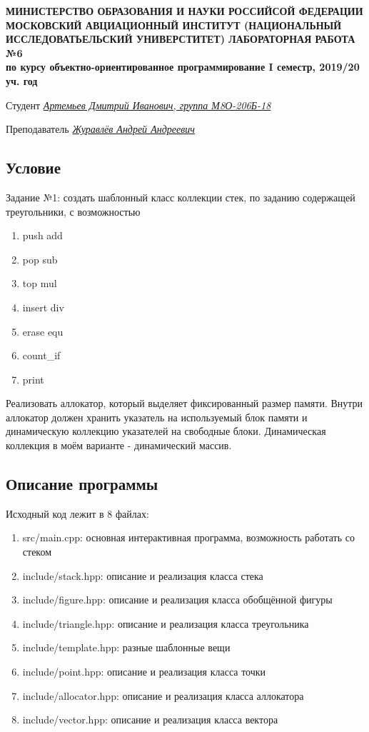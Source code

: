 \documentclass[12pt]{article}
\begin{document}
\begin{titlepage}
\begin{center}
\textbf{МИНИСТЕРСТВО ОБРАЗОВАНИЯ И НАУКИ РОССИЙСОЙ ФЕДЕРАЦИИ
\medskip
МОСКОВСКИЙ АВЦИАЦИОННЫЙ ИНСТИТУТ
(НАЦИОНАЛЬНЫЙ ИССЛЕДОВАТЬЕЛЬСКИЙ УНИВЕРСТИТЕТ)
\vfill\vfill
{\Huge ЛАБОРАТОРНАЯ РАБОТА №6} \\
по курсу объектно-ориентированное программирование
I семестр, 2019/20 уч. год}
\end{center}
\vfill

Студент \uline{\it {Артемьев Дмитрий Иванович, группа М8О-206Б-18}\hfill}

Преподаватель \uline{\it {Журавлёв Андрей Андреевич}\hfill}

\vfill
\end{titlepage}

\subsection*{Условие}

Задание №1: создать шаблонный класс коллекции стек, по заданию содержащей треугольники, с возможностью
\begin{enumerate}
\item push add
\item pop sub
\item top mul
\item insert div
\item erase equ
\item count\_if
\item print
\end{enumerate}

Реализовать аллокатор, который выделяет фиксированный размер памяти. Внутри аллокатор должен хранить указатель на используемый блок памяти и динамическую коллекцию указателей на свободные блоки. Динамическая коллекция в моём варианте - динамический массив. 

\subsection*{Описание программы}

Исходный код лежит в 8 файлах:
\begin{enumerate}
\item src/main.cpp: основная интерактивная программа, возможность работать со стеком
\item include/stack.hpp: описание и реализация класса стека
\item include/figure.hpp: описание и реализация класса обобщённой фигуры
\item include/triangle.hpp: описание и реализация класса треугольника
\item include/template.hpp: разные шаблонные вещи
\item include/point.hpp: описание и реализация класса точки
\item include/allocator.hpp: описание и реализация класса аллокатора
\item include/vector.hpp: описание и реализация класса вектора
  
\end{enumerate}
\end{document}
